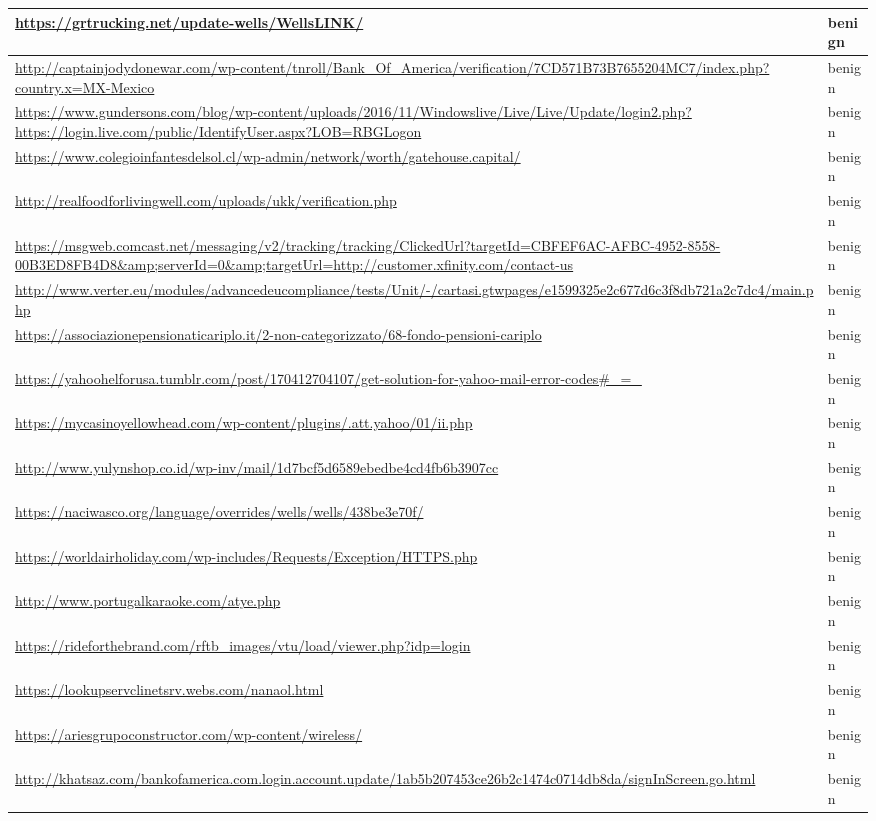 \documentclass[12pt,twoside]{report}
\begin{document}
\begin{spacing}{1}
\begin{center}
\begin{longtable}{ |>{\raggedright\arraybackslash}p{}|>{\raggedright\arraybackslash}p{}| }
\hline
\url{https://grtrucking.net/update-wells/WellsLINK/} & benign
\\
\hline
\url{http://captainjodydonewar.com/wp-content/tnroll/Bank_Of_America/verification/7CD571B73B7655204MC7/index.php?country.x=MX-Mexico} & benign
\\
\hline
\url{https://www.gundersons.com/blog/wp-content/uploads/2016/11/Windowslive/Live/Live/Update/login2.php?https://login.live.com/public/IdentifyUser.aspx?LOB=RBGLogon} & benign
\\
\hline
\url{https://www.colegioinfantesdelsol.cl/wp-admin/network/worth/gatehouse.capital/} & benign
\\
\hline
\url{http://realfoodforlivingwell.com/uploads/ukk/verification.php} & benign
\\
\hline
\url{https://msgweb.comcast.net/messaging/v2/tracking/tracking/ClickedUrl?targetId=CBFEF6AC-AFBC-4952-8558-00B3ED8FB4D8&amp;serverId=0&amp;targetUrl=http://customer.xfinity.com/contact-us} & benign
\\
\hline
\url{http://www.verter.eu/modules/advancedeucompliance/tests/Unit/-/cartasi.gtwpages/e1599325e2c677d6c3f8db721a2c7dc4/main.php} & benign
\\
\hline
\url{https://associazionepensionaticariplo.it/2-non-categorizzato/68-fondo-pensioni-cariplo} & benign
\\
\hline
\url{https://yahoohelforusa.tumblr.com/post/170412704107/get-solution-for-yahoo-mail-error-codes#_=_} & benign
\\
\hline
\url{https://mycasinoyellowhead.com/wp-content/plugins/.att.yahoo/01/ii.php} & benign
\\
\hline
\url{http://www.yulynshop.co.id/wp-inv/mail/1d7bcf5d6589ebedbe4cd4fb6b3907cc} & benign
\\
\hline
\url{https://naciwasco.org/language/overrides/wells/wells/438be3e70f/} & benign
\\
\hline
\url{https://worldairholiday.com/wp-includes/Requests/Exception/HTTPS.php} & benign
\\
\hline
\url{http://www.portugalkaraoke.com/atye.php} & benign
\\
\hline
\url{https://rideforthebrand.com/rftb_images/vtu/load/viewer.php?idp=login} & benign
\\
\hline
\url{https://lookupservclinetsrv.webs.com/nanaol.html} & benign
\\
\hline
\url{https://ariesgrupoconstructor.com/wp-content/wireless/} & benign
\\
\hline
\url{http://khatsaz.com/bankofamerica.com.login.account.update/1ab5b207453ce26b2c1474c0714db8da/signInScreen.go.html} & benign

\end{longtable}
\end{center}
\end{spacing}
\end{document}
